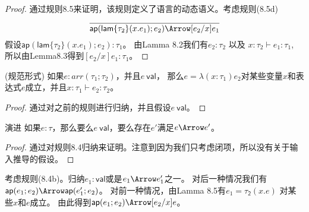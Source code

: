 \begin{proof}
通过规则8.5来证明，该规则定义了语言的动态语义。考虑规则(8.5d)
$$\dfrac{}
{\mathsf{ap} ( \mathsf{lam} \{ \tau_2 \} (x.e_1);e_2) \Arrow [e_2/x]e_1}$$
假设$\mathsf{ap}(\mathsf{lam}\{\tau_2\}(x.e_1);e_2):\tau_1$。
由Lamma 8.2我们有$e_2:\tau_2$ 以及 $x : \tau_2 \vdash e_1 : \tau_1$,
所以由Lemma8.3得到$[e_2/x]e_1:\tau_1$。
\end{proof}

\begin{lemma}(规范形式)
 如果$e:{arr}(\tau_1;\tau_2) $，并且$e\ \mathsf{val}$，
 那么$e=\lambda(x:\tau_1)e_2$对某些变量$x$和表达式$e$成立，并且$x:\tau_1 \vdash e_2:\tau_2$。
\end{lemma}

\begin{proof}
通过对之前的规则进行归纳，并且假设$e\ \mathsf{val}$。
\end{proof}

\begin{theorem}{演进}
如果$e:\tau$，那么要么$e\ \mathsf{val}$，要么存在$e'$满足$e \Arrow e'$。
\end{theorem}

\begin{proof}
通过对规则8.4归纳来证明。注意到因为我们只考虑闭项，所以没有关于输入推导的假设。
\end{proof}

考虑规则(8.4b)。归纳$e_1:\mathsf{val}$或是$e_1 \Arrow e'_1$之一。
对后一种情况我们有$ \mathsf{ap}(e_1;e_2) \Arrow \mathsf{ap}(e'_1;e_2)$。
对前一种情况，由Lamma 8.5有$e_1=\mathsf{\tau_2}(x.e)$ 对某些$x$和$e$成立。
由此得到$ \mathsf{ap}(e_1;e_2) \Arrow [e_2/x]e$。